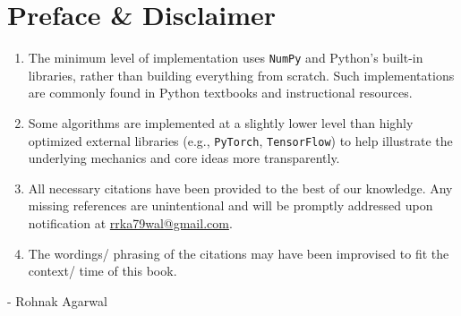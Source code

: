 \chapter*{Preface \& Disclaimer}

\begin{enumerate}[itemsep=0.3cm]
    \item The minimum level of implementation uses \texttt{NumPy} and Python’s built-in libraries, rather than building everything from scratch. Such implementations are commonly found in Python textbooks and instructional resources.

    \item Some algorithms are implemented at a slightly lower level than highly optimized external libraries (e.g., \texttt{PyTorch}, \texttt{TensorFlow}) to help illustrate the underlying mechanics and core ideas more transparently.

    \item All necessary citations have been provided to the best of our knowledge. Any missing references are unintentional and will be promptly addressed upon notification at \href{mailto:rrka79wal@gmail.com}{rrka79wal@gmail.com}.

    \item The wordings/ phrasing of the citations may have been improvised to fit the context/ time of this book.

\end{enumerate}

\vspace{1cm}

- Rohnak Agarwal










